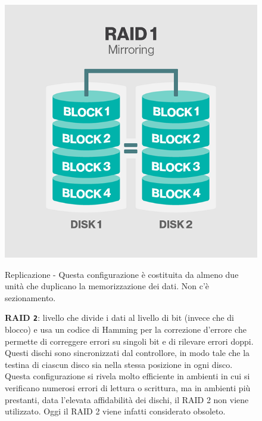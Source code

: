 \begin{itemize}
\begin{figure}[htbp]
\centering
\includegraphics[scale=0.40]{img/raid11.png}\\
\caption{Replicazione - Questa configurazione \`{e} costituita da almeno due unit\`{a} che duplicano la memorizzazione dei dati. Non c'\`{e} sezionamento.\label{figura1.4} \cite{etichetta9}}
\end{figure}

\begin{figure}[htbp]
\item
\textbf{RAID \verb"2"}: livello che divide i dati al livello di bit (invece che di blocco) e usa un codice di Hamming per la correzione d'errore che permette di correggere errori su singoli bit e di rilevare errori doppi. Questi dischi sono sincronizzati dal controllore, in modo tale che la testina di ciascun disco sia nella stessa posizione in ogni disco. Questa configurazione si rivela molto efficiente in ambienti in cui si verificano numerosi errori di lettura o scrittura, ma in ambienti pi\`{u} prestanti, data l'elevata affidabilit\`{a} dei dischi, il RAID 2 non viene utilizzato. Oggi il RAID 2 viene infatti considerato obsoleto.\cite{etichetta10}\\


\end{figure}
\end{itemize}
